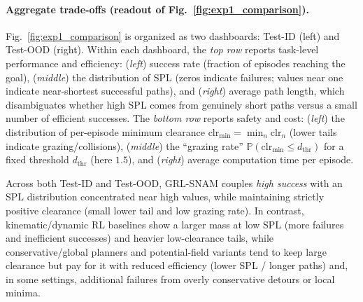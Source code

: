 \documentclass{article} %
\begin{document}
\paragraph{Aggregate trade-offs (readout of Fig.~\ref{fig:exp1_comparison}).}
{Fig.~\ref{fig:exp1_comparison} is organized as two dashboards: Test-ID (left) and Test-OOD (right).
Within each dashboard, the \emph{top row} reports task-level performance and efficiency:
(\textit{left}) success rate (fraction of episodes reaching the goal),
(\textit{middle}) the distribution of SPL (zeros indicate failures; values near one indicate near-shortest successful paths),
and (\textit{right}) average path length, which disambiguates whether high SPL comes from genuinely short paths versus a small number of efficient successes.
The \emph{bottom row} reports safety and cost:
(\textit{left}) the distribution of per-episode minimum clearance
$\mathrm{clr}_{\min}=\min_n \mathrm{clr}_n$ (lower tails indicate grazing/collisions),
(\textit{middle}) the “grazing rate” $\mathbb{P}(\mathrm{clr}_{\min}\le d_{\text{thr}})$ for a fixed threshold $d_{\text{thr}}$ (here $1.5$),
and (\textit{right}) average computation time per episode.

Across both Test-ID and Test-OOD, GRL-SNAM couples \emph{high success} with an SPL distribution concentrated near high values, while maintaining strictly positive clearance (small lower tail and low grazing rate).
In contrast, kinematic/dynamic RL baselines show a larger mass at low SPL (more failures and inefficient successes) and heavier low-clearance tails, while conservative/global planners and potential-field variants tend to keep large clearance but pay for it with reduced efficiency (lower SPL / longer paths) and, in some settings, additional failures from overly conservative detours or local minima.}
\end{document}
